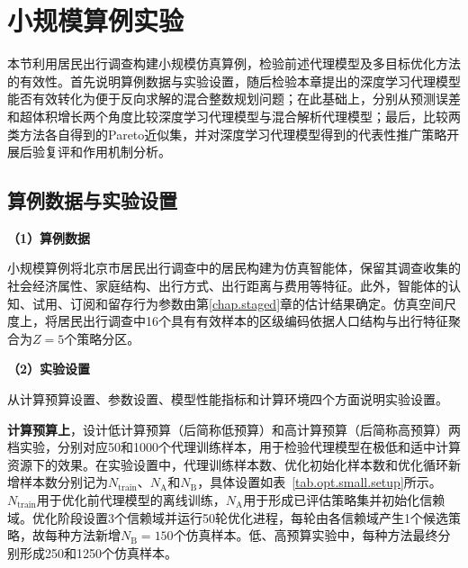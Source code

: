 \section{小规模算例实验}\label{sec.opt.exp.small}

本节利用居民出行调查构建小规模仿真算例，检验前述代理模型及多目标优化方法的有效性。首先说明算例数据与实验设置，随后检验本章提出的深度学习代理模型能否有效转化为便于反向求解的混合整数规划问题；在此基础上，分别从预测误差和超体积增长两个角度比较深度学习代理模型与混合解析代理模型；最后，比较两类方法各自得到的Pareto近似集，并对深度学习代理模型得到的代表性推广策略开展后验复评和作用机制分析。

\subsection{算例数据与实验设置}\label{subsec.opt.small.setup}

\textbf{（1）算例数据}

小规模算例将北京市居民出行调查中的居民构建为仿真智能体，保留其调查收集的社会经济属性、家庭结构、出行方式、出行距离与费用等特征。此外，智能体的认知、试用、订阅和留存行为参数由第\ref{chap.staged}章的估计结果确定。仿真空间尺度上，将居民出行调查中16个具有有效样本的区级编码依据人口结构与出行特征聚合为$Z=5$个策略分区。

\textbf{（2）实验设置}

从计算预算设置、参数设置、模型性能指标和计算环境四个方面说明实验设置。

\textbf{计算预算上}，设计低计算预算（后简称低预算）和高计算预算（后简称高预算）两档实验，分别对应50和1000个代理训练样本，用于检验代理模型在极低和适中计算资源下的效果。在实验设置中，代理训练样本数、优化初始化样本数和优化循环新增样本数分别记为$N_{\mathrm{train}}$、$N_{\mathrm A}$和$N_{\mathrm B}$，具体设置如表~\ref{tab.opt.small.setup}所示。$N_{\mathrm{train}}$用于优化前代理模型的离线训练，$N_{\mathrm A}$用于形成已评估策略集并初始化信赖域。优化阶段设置3个信赖域并运行50轮优化进程，每轮由各信赖域产生1个候选策略，故每种方法新增$N_{\mathrm B}=150$个仿真样本。低、高预算实验中，每种方法最终分别形成250和1250个仿真样本。

